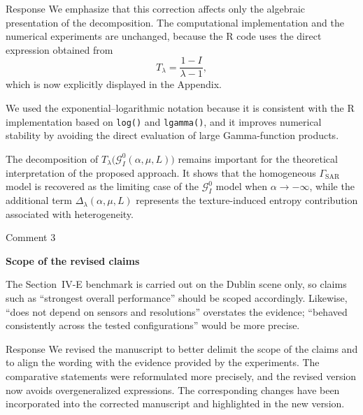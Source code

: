 \documentclass[11pt]{report}
\begin{document}
\begin{responsebox}{Response}
We emphasize that this correction affects only the algebraic presentation of the decomposition. 
The computational implementation and the numerical experiments are unchanged, because the R code uses the direct expression obtained from
\begin{equation*}
T_\lambda=\frac{1-I}{\lambda-1},
\end{equation*}
which is now explicitly displayed in the Appendix.

We used the exponential--logarithmic notation because it is consistent with the R implementation based on \texttt{log()} and \texttt{lgamma()}, and it improves numerical stability by avoiding the direct evaluation of large Gamma-function products.

The decomposition of $T_\lambda\bigl(\mathcal{G}^0_I(\alpha,\mu,L)\bigr)$ remains important for the theoretical interpretation of the proposed approach. It shows that the homogeneous $\Gamma_{\mathrm{SAR}}$ model is recovered as the limiting case of the $\mathcal{G}^0_I$ model when $\alpha\to-\infty$, while the additional term $\Delta_\lambda(\alpha,\mu,L)$ represents the texture-induced entropy contribution associated with heterogeneity.

\end{responsebox}




\vspace{1em}

\begin{reviewbox}{Comment 3}

\textbf{Scope of the revised claims}

The Section~IV-E benchmark is carried out on the Dublin scene only, so claims such as ``strongest overall performance'' should be scoped accordingly. Likewise, ``does not depend on sensors and resolutions'' overstates the evidence; ``behaved consistently across the tested configurations'' would be more precise.

\end{reviewbox}

\begin{responsebox}{Response}
We revised the manuscript to better delimit the scope of the claims and to align the wording with the evidence provided by the experiments. 
The comparative statements were reformulated more precisely, and the revised version now avoids overgeneralized expressions. 
The corresponding changes have been incorporated into the corrected manuscript and highlighted in the new version.

\end{responsebox}

\vspace{0.5cm}
\end{document}
